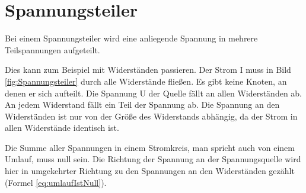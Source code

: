 \documentclass[aspectratio=169, ignorenonframetext]{beamer}
\begin{document}
\section{Spannungsteiler}

Bei einem Spannungsteiler wird eine anliegende Spannung in mehrere Teilspannungen aufgeteilt.

Dies kann zum Beispiel mit Widerständen passieren. Der Strom I muss in Bild \ref{fig:Spannungsteiler} durch alle Widerstände fließen. Es gibt keine Knoten, an denen er sich aufteilt. Die Spannung U der Quelle fällt an allen Widerständen ab. An jedem Widerstand fällt ein Teil der Spannung ab. Die Spannung an den Widerständen ist nur von der Größe des Widerstands abhängig, da der Strom in allen Widerstände identisch ist.

Die Summe aller Spannungen in einem Stromkreis, man spricht auch von einem Umlauf, muss null sein. Die Richtung der Spannung an der Spannungsquelle wird hier in umgekehrter Richtung zu den Spannungen an den Widerständen gezählt (Formel \ref{eq:umlaufIstNull}).
\end{document}
